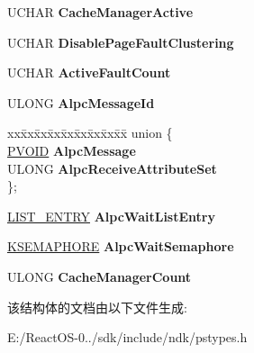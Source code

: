 \begin{DoxyCompactItemize}
\begin{tabbing}
\end{tabbing}\item 
\mbox{\label{struct___e_t_h_r_e_a_d_a1a6d39cd3e95ac014fe4d91975b4b58c}} 
U\+C\+H\+AR {\bfseries Cache\+Manager\+Active}
\item 
\mbox{\label{struct___e_t_h_r_e_a_d_a686ef78656fc162c2005b1ed94032b27}} 
U\+C\+H\+AR {\bfseries Disable\+Page\+Fault\+Clustering}
\item 
\mbox{\label{struct___e_t_h_r_e_a_d_a8f05165dbc98a637ef3cb887eadf5987}} 
U\+C\+H\+AR {\bfseries Active\+Fault\+Count}
\item 
\mbox{\label{struct___e_t_h_r_e_a_d_a4ec0dd2f17d69f5108478c2eeed827ad}} 
U\+L\+O\+NG {\bfseries Alpc\+Message\+Id}
\item 
\mbox{\label{struct___e_t_h_r_e_a_d_a67e8f8e5a3e01fb4d9b7cfbacfd5eae8}} 
\begin{tabbing}
xx\=xx\=xx\=xx\=xx\=xx\=xx\=xx\=xx\=\kill
union \{\\
\>\hyperlink{interfacevoid}{PVOID} {\bfseries AlpcMessage}\\
\>ULONG {\bfseries AlpcReceiveAttributeSet}\\
\}; \\

\end{tabbing}\item 
\mbox{\label{struct___e_t_h_r_e_a_d_aaad035d615a016883e7061459aa6b393}} 
\hyperlink{struct___l_i_s_t___e_n_t_r_y}{L\+I\+S\+T\+\_\+\+E\+N\+T\+RY} {\bfseries Alpc\+Wait\+List\+Entry}
\item 
\mbox{\label{struct___e_t_h_r_e_a_d_af0a49bd1ef434b939a6a2d12cfe9f571}} 
\hyperlink{struct___k_s_e_m_a_p_h_o_r_e}{K\+S\+E\+M\+A\+P\+H\+O\+RE} {\bfseries Alpc\+Wait\+Semaphore}
\item 
\mbox{\label{struct___e_t_h_r_e_a_d_a4e57be01a4ac3ff3ed56728a47ad89c9}} 
U\+L\+O\+NG {\bfseries Cache\+Manager\+Count}
\end{DoxyCompactItemize}


该结构体的文档由以下文件生成\+:\begin{DoxyCompactItemize}
\item 
E\+:/\+React\+O\+S-\/0../sdk/include/ndk/pstypes.\+h\end{DoxyCompactItemize}
